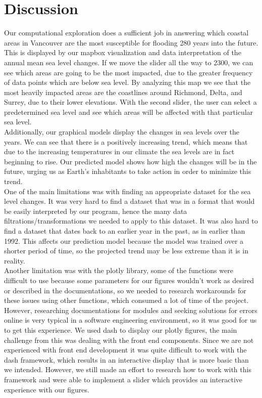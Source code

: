 \documentclass[fontsize=11pt]{article}
\begin{document}
    \section*{Discussion}
    \hspace{\parindent}Our computational exploration does a sufficient job in answering which coastal areas in Vancouver are the most susceptible for flooding 280 years into the future. This is displayed by our mapbox visualization and data interpretation of the annual mean sea level changes. If we move the slider all the way to 2300, we can see which areas are going to be the most impacted, due to the greater frequency of data points which are below sea level. By analyzing this map we see that the most heavily impacted areas are the coastlines around Richmond, Delta, and Surrey, due to their lower elevations. With the second slider, the user can select a predetermined sea level and see which areas will be affected with that particular sea level. \\

    Additionally, our graphical models display the changes in sea levels over the years. We can see that there is a positively increasing trend, which means that due to the increasing temperatures in our climate the sea levels are in fact beginning to rise. Our predicted model shows how high the changes will be in the future, urging us as Earth’s inhabitants to take action in order to minimize this trend. \\

    One of the main limitations was with finding an appropriate dataset for the sea level changes. It was very hard to find a dataset that was in a format that would be easily interpreted by our program, hence the many data filtrations/transformations we needed to apply to this dataset. It was also hard to find a dataset that dates back to an earlier year in the past, as in earlier than 1992. This affects our prediction model because the model was trained over a shorter period of time, so the projected trend may be less extreme than it is in reality. \\

    Another limitation was with the plotly library, some of the functions were difficult to use because some parameters for our figures wouldn’t work as desired or described in the documentations, so we needed to research workarounds for these issues using other functions, which consumed a lot of time of the project. However, researching documentations for modules and seeking solutions for errors online is very typical in a software engineering environment, so it was good for us to get this experience. We used dash to display our plotly figures, the main challenge from this was dealing with the front end components. Since we are not experienced with front end development it was quite difficult to work with the dash framework, which results in an interactive display that is more basic than we intended. However, we still made an effort to research how to work with this framework and were able to implement a slider which provides an interactive experience with our figures. \\
\end{document}
